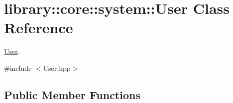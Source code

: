 \hypertarget{classlibrary_1_1core_1_1system_1_1_user}{}\section{library\+:\+:core\+:\+:system\+:\+:User Class Reference}
\label{classlibrary_1_1core_1_1system_1_1_user}


\hyperlink{classlibrary_1_1core_1_1system_1_1_user}{User}.  




{\ttfamily \#include $<$User.\+hpp$>$}

\subsection*{Public Member Functions}
